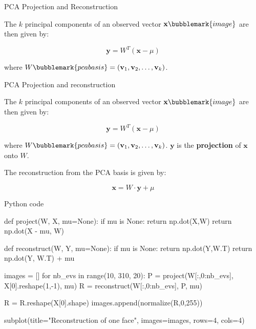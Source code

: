\documentclass[compress]{beamer}
\begin{document}

\begin{frame}{PCA Projection and Reconstruction}

    The $k$ principal components of an observed vector
    $\mathbf{x}\bubblemark{image}$ are then given by:

    \[
        \mathbf{y} = W^{T} (\mathbf{x} - \mu)
    \]

    where $W\bubblemark{pcabasis} = (\mathbf{v}_{1}, \mathbf{v}_{2}, \ldots, \mathbf{v}_{k})$.
    

\end{frame}


\begin{frame}{PCA Projection and reconstruction}

    The $k$ principal components of an observed vector
    $\mathbf{x}\bubblemark{image}$ are then given by:

    \[
        \mathbf{y} = W^{T} (\mathbf{x} - \mu)
    \]

    where $W\bubblemark{pcabasis} = (\mathbf{v}_{1}, \mathbf{v}_{2}, \ldots,
    \mathbf{v}_{k})$. $\mathbf{y}$ is the \textbf{projection} of $\mathbf{x}$
    onto
    $W$.
    


    The reconstruction from the PCA basis is given by:

    \[
        \mathbf{x} = W \cdot \mathbf{y} + \mu
    \]

\end{frame}

\begin{frame}[fragile]{Python code}

\begin{pythoncode}
def project(W, X, mu=None):
    if mu is None:
        return np.dot(X,W)
    return np.dot(X - mu, W)

def reconstruct(W, Y, mu=None):
    if mu is None:
        return np.dot(Y,W.T)
    return np.dot(Y, W.T) + mu

images = []
for nb_evs in range(10, 310, 20):
    P = project(W[:,0:nb_evs], X[0].reshape(1,-1), mu)
    R = reconstruct(W[:,0:nb_evs], P, mu)

    R = R.reshape(X[0].shape)
    images.append(normalize(R,0,255))

subplot(title="Reconstruction of one face", images=images, rows=4, cols=4)
\end{pythoncode}
\end{frame}
\end{document}
